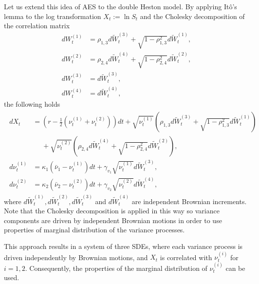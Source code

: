 \documentclass[]{interact}
\theoremstyle{plain}%
\theoremstyle{definition}
\theoremstyle{remark}
\begin{document}

Let us extend this idea of AES to the double Heston model. By applying It\^{o}'s lemma to the log transformation $X_t:=\ln S_t$ and the Cholesky decomposition of the correlation matrix 
\begin{align*}
    dW_{t}^{(1)} &= \rho_{1,3} d\widetilde{W}_t^{(3)} + \sqrt{1 - \rho_{1,3}^2} d\widetilde{W}_t^{(1)}, \\
    dW_{t}^{(2)} &= \rho_{2,4} d\widetilde{W}_t^{(4)} + \sqrt{1 - \rho_{2,4}^2} d\widetilde{W}_t^{(2)}, \\
    dW_{t}^{(3)} &= d\widetilde{W}_t^{(3)}, \\
    dW_{t}^{(4)} &= d\widetilde{W}_t^{(4)},
\end{align*}
the following holds
\begin{gather*}
    \begin{split}
        d X_t&=\left(r-\frac{1}{2}\left(\nu_{t}^{(1)}+\nu_{t}^{(2)} \right) \right)d t+\sqrt{\nu_{t}^{(1)}} \left(\rho_{1,3} d\widetilde{W}_{t}^{(3)}+\sqrt{1-\rho^2_{1,3}} d\widetilde{W}_{t}^{(1)}\right)  \\
&\phantom{=} +\sqrt{\nu_{t}^{(2)}} \left(\rho_{2,4}  d\widetilde{W}_{t}^{(4)}+\sqrt{1-\rho^2_{2,4}} d\widetilde{W}_{t}^{(2)}\right),\\
d \nu_{t}^{(1)}&=\kappa_{1}\left(\bar{\nu}_{1}-\nu_{t}^{(1)}\right) d t+\gamma_{v_{1}} \sqrt{\nu_{t}^{(1)}} d \widetilde{W}_{t}^{(3)},\\
d \nu_{t}^{(2)}&=\kappa_{2}\left(\bar{\nu}_{2}-\nu_{t}^{(2)}\right)d t+\gamma_{v_{2}} \sqrt{\nu_{t}^{(2)}} d \widetilde{W}_{t}^{(4)},
    \end{split}
\end{gather*}
where $d \widetilde{W}_{t}^{(1)},d \widetilde{W}_{t}^{(2)},d \widetilde{W}_{t}^{(3)}$ and $d \widetilde{W}_{t}^{(4)}$ are independent Brownian increments. Note that the Cholesky decomposition is applied in this way so variance components are driven by independent Brownian motions in order to use properties of marginal distribution of the variance processes.

This approach results in a system of three SDEs, where each variance process is driven independently by Brownian motions, and $X_t$ is correlated with $\nu_t^{(i)}$ for $i=1,2$. Consequently, the properties of the marginal distribution of $\nu_t^{(i)}$ can be used.
\end{document}
